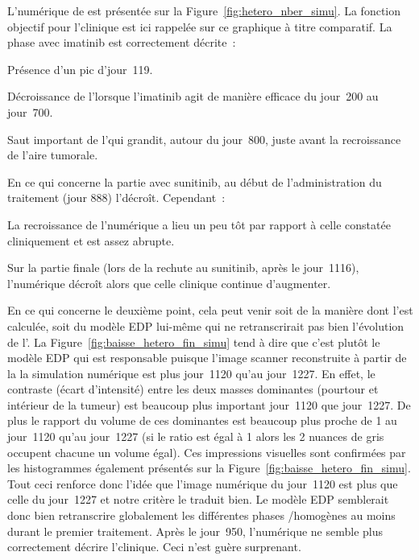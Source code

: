 \documentclass[main.tex]{subfiles}
\begin{document}
L'\hetero numérique de \Nber est présentée sur la Figure~\ref{fig:hetero_nber_simu}. 
La fonction objectif pour l'\hetero clinique %
est ici rappelée sur ce graphique à titre comparatif. La phase avec imatinib est  correctement décrite~:
\begin{myitemize}
\item Présence d'un pic d'\hetero jour~119.
\item Décroissance de l'\hetero lorsque l'imatinib agit de manière efficace du jour~200 au jour~700.
\item Saut important de l'\hetero qui grandit, autour du jour~800, juste avant la recroissance de l'aire tumorale.
\end{myitemize}
En ce qui concerne la partie avec sunitinib, au début de l'administration du traitement (jour 888) l'\hetero décroît. Cependant~:
\begin{myitemize}
\item La recroissance de l'\hetero numérique a lieu un peu tôt par rapport à celle constatée cliniquement et est assez abrupte.
\item Sur la partie finale (lors de la rechute au sunitinib, après le jour~1116), l'\hetero numérique décroît alors que celle clinique continue d'augmenter. 
\end{myitemize}
En ce qui concerne le deuxième point, cela peut venir soit de la manière dont  l'\hetero est calculée, soit du modèle EDP lui-même qui ne retranscrirait pas bien l'évolution de l'\hetero. La Figure~\ref{fig:baisse_hetero_fin_simu} tend à dire que c'est plutôt le modèle EDP qui est responsable puisque l'image scanner reconstruite à partir de la la simulation numérique est 
plus \heterogene jour~1120 qu'au jour~1227. 
En effet, le contraste (écart d'intensité) entre les deux masses dominantes (pourtour et intérieur de la tumeur) 
est beaucoup plus important jour~1120 que jour~1227. De plus le rapport du volume de ces dominantes est beaucoup plus proche de 1 au jour~1120 qu'au jour~1227 (si le ratio est égal à 1 alors les 2 nuances de gris occupent chacune un volume égal). Ces impressions visuelles sont confirmées par les histogrammes également présentés sur la Figure~\ref{fig:baisse_hetero_fin_simu}. 
Tout ceci renforce donc l'idée que l'image numérique du jour~1120 est plus \heterogene que celle du jour~1227 et notre critère le traduit bien. Le modèle EDP semblerait donc bien retranscrire globalement les différentes phases  \heterogenes /homogènes au moins durant le premier traitement. Après le jour~950, l'\hetero numérique ne semble plus correctement  décrire l'\hetero clinique. Ceci n'est guère surprenant. %
\end{document}
